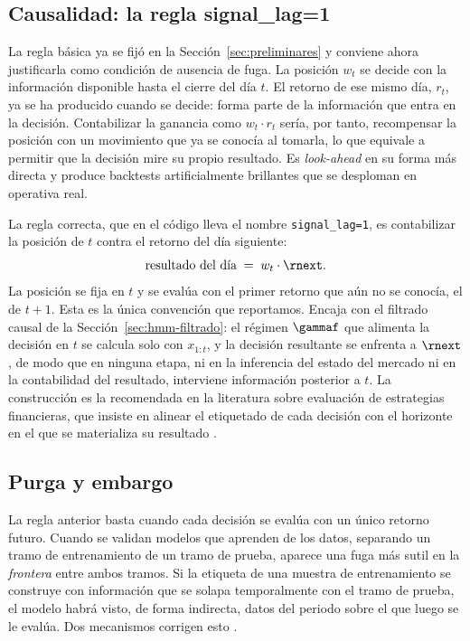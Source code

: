 \subsection{Causalidad: la regla signal\_lag=1}
\label{sec:cpcv-causalidad}

La regla básica ya se fijó en la Sección~\ref{sec:preliminares} y conviene ahora justificarla como condición de ausencia de fuga. La posición $w_t$ se decide con la información disponible hasta el cierre del día $t$. El retorno de ese mismo día, $r_t$, ya se ha producido cuando se decide: forma parte de la información que entra en la decisión. Contabilizar la ganancia como $w_t \cdot r_t$ sería, por tanto, recompensar la posición con un movimiento que ya se conocía al tomarla, lo que equivale a permitir que la decisión mire su propio resultado. Es \emph{look-ahead} en su forma más directa y produce backtests artificialmente brillantes que se desploman en operativa real.

La regla correcta, que en el código lleva el nombre \texttt{signal\_lag=1}, es contabilizar la posición de $t$ contra el retorno del día siguiente:
\[
\text{resultado del día} \;=\; w_t \cdot \rnext.
\]
La posición se fija en $t$ y se evalúa con el primer retorno que aún no se conocía, el de $t+1$. Esta es la única convención que reportamos. Encaja con el filtrado causal de la Sección~\ref{sec:hmm-filtrado}: el régimen $\gammaf$ que alimenta la decisión en $t$ se calcula solo con $x_{1:t}$, y la decisión resultante se enfrenta a $\rnext$, de modo que en ninguna etapa, ni en la inferencia del estado del mercado ni en la contabilidad del resultado, interviene información posterior a $t$. La construcción es la recomendada en la literatura sobre evaluación de estrategias financieras, que insiste en alinear el etiquetado de cada decisión con el horizonte en el que se materializa su resultado \cite{lopezdeprado2018}.

\subsection{Purga y embargo}
\label{sec:cpcv-purga}

La regla anterior basta cuando cada decisión se evalúa con un único retorno futuro. Cuando se validan modelos que aprenden de los datos, separando un tramo de entrenamiento de un tramo de prueba, aparece una fuga más sutil en la \emph{frontera} entre ambos tramos. Si la etiqueta de una muestra de entrenamiento se construye con información que se solapa temporalmente con el tramo de prueba, el modelo habrá visto, de forma indirecta, datos del periodo sobre el que luego se le evalúa. Dos mecanismos corrigen esto \cite{lopezdeprado2018}.

